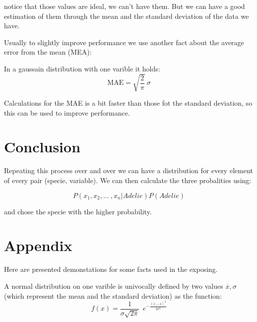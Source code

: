 \documentclass[11pt]{article}
\begin{document}
notice that those values are ideal, we can't have them. But we can have a good
estimation of them through the mean and the standard deviation of the data we
have.

Usually to slightly improve performance we use another fact about the average
error from the mean (MEA):
\begin{proposition}{}{}
    In a gaussain distribution with one varible it holds:
    \[
        \text{MAE} = \sqrt{\frac{2}{\pi}} \ \sigma
    \]
\end{proposition}
Calculations for the MAE is a bit faster than those fot the standard deviation,
so this can be used to improve performance.

\section*{Conclusion}

Repeating this process over and over we can have a distribution for every
element of every pair (specie, variable). We can then calculate the three
probalities using:

\[
    P(x_1,x_2, \dots \ , x_n|Adelie) P(Adelie)
\]

and chose the specie with the higher probability.

\section*{Appendix}

Here are presented demonstations for some facts used in the exposing.

\begin{proposition}{}{}
    A normal distribution on one varible is univocally defined by two values
    $\overline{x}, \sigma$ (which represent the mean and the standard deviation)
    as the function:
    \[
        f(x) = \frac{1}{\sigma \sqrt{2\pi}} \ \ e^{- \frac{(x-\overline{x})^2}{2\sigma^2}}
    \]
\end{proposition}
\end{document}
